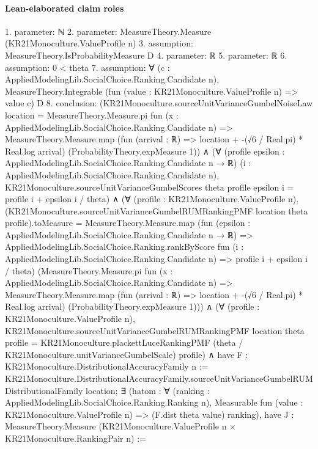 \documentclass[10pt]{article}
\begin{document}
\paragraph{Lean-elaborated claim roles}\begin{ReviewVerbatim}
1. parameter: ℕ
2. parameter: MeasureTheory.Measure (KR21Monoculture.ValueProfile n)
3. assumption: MeasureTheory.IsProbabilityMeasure D
4. parameter: ℝ
5. parameter: ℝ
6. assumption: 0 < theta
7. assumption: ∀ (c : AppliedModelingLib.SocialChoice.Ranking.Candidate n),
  MeasureTheory.Integrable (fun (value : KR21Monoculture.ValueProfile n) => value c) D
8. conclusion: (KR21Monoculture.sourceUnitVarianceGumbelNoiseLaw location =
    MeasureTheory.Measure.pi fun (x : AppliedModelingLib.SocialChoice.Ranking.Candidate n) =>
      MeasureTheory.Measure.map (fun (arrival : ℝ) => location + -(√6 / Real.pi) * Real.log arrival)
        (ProbabilityTheory.expMeasure 1)) ∧
  (∀ (profile epsilon : AppliedModelingLib.SocialChoice.Ranking.Candidate n → ℝ)
      (i : AppliedModelingLib.SocialChoice.Ranking.Candidate n),
      KR21Monoculture.sourceUnitVarianceGumbelScores theta profile epsilon i = profile i + epsilon i / theta) ∧
    (∀ (profile : KR21Monoculture.ValueProfile n),
        (KR21Monoculture.sourceUnitVarianceGumbelRUMRankingPMF location theta profile).toMeasure =
          MeasureTheory.Measure.map
            (fun (epsilon : AppliedModelingLib.SocialChoice.Ranking.Candidate n → ℝ) =>
              AppliedModelingLib.SocialChoice.Ranking.rankByScore
                fun (i : AppliedModelingLib.SocialChoice.Ranking.Candidate n) => profile i + epsilon i / theta)
            (MeasureTheory.Measure.pi fun (x : AppliedModelingLib.SocialChoice.Ranking.Candidate n) =>
              MeasureTheory.Measure.map (fun (arrival : ℝ) => location + -(√6 / Real.pi) * Real.log arrival)
                (ProbabilityTheory.expMeasure 1))) ∧
      (∀ (profile : KR21Monoculture.ValueProfile n),
          KR21Monoculture.sourceUnitVarianceGumbelRUMRankingPMF location theta profile =
            KR21Monoculture.plackettLuceRankingPMF (theta / KR21Monoculture.unitVarianceGumbelScale) profile) ∧
        have F : KR21Monoculture.DistributionalAccuracyFamily n :=
          KR21Monoculture.DistributionalAccuracyFamily.sourceUnitVarianceGumbelRUMDistributionalFamily location;
        ∃ (hatom :
          ∀ (ranking : AppliedModelingLib.SocialChoice.Ranking.Ranking n),
            Measurable fun (value : KR21Monoculture.ValueProfile n) => (F.dist theta value) ranking),
          have J : MeasureTheory.Measure (KR21Monoculture.ValueProfile n × KR21Monoculture.RankingPair n) :=

\end{ReviewVerbatim}
\end{document}
